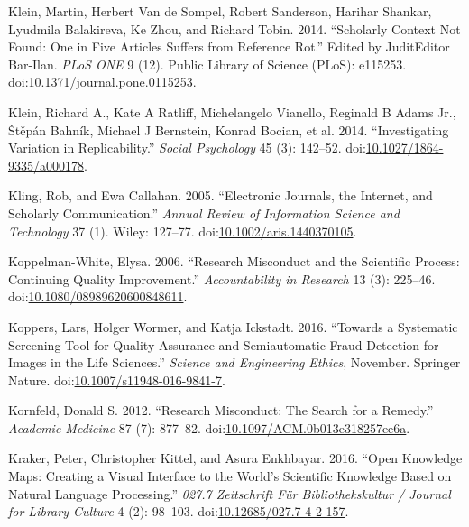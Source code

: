 \documentclass[a5paper]{book}
\begin{document}
\hypertarget{ref-doi:10.1371ux2fjournal.pone.0115253}{}
Klein, Martin, Herbert Van de Sompel, Robert Sanderson, Harihar Shankar,
Lyudmila Balakireva, Ke Zhou, and Richard Tobin. 2014. ``Scholarly
Context Not Found: One in Five Articles Suffers from Reference Rot.''
Edited by JuditEditor Bar-Ilan. \emph{PLoS ONE} 9 (12). Public Library
of Science (PLoS): e115253.
doi:\href{https://doi.org/10.1371/journal.pone.0115253}{10.1371/journal.pone.0115253}.

\hypertarget{ref-doi:10.1027ux2f1864-9335ux2fa000178}{}
Klein, Richard A., Kate A Ratliff, Michelangelo Vianello, Reginald B
Adams Jr., Štěpán Bahník, Michael J Bernstein, Konrad Bocian, et al.
2014. ``Investigating Variation in Replicability.'' \emph{Social
Psychology} 45 (3): 142--52.
doi:\href{https://doi.org/10.1027/1864-9335/a000178}{10.1027/1864-9335/a000178}.

\hypertarget{ref-doi:10.1002ux2faris.1440370105}{}
Kling, Rob, and Ewa Callahan. 2005. ``Electronic Journals, the Internet,
and Scholarly Communication.'' \emph{Annual Review of Information
Science and Technology} 37 (1). Wiley: 127--77.
doi:\href{https://doi.org/10.1002/aris.1440370105}{10.1002/aris.1440370105}.

\hypertarget{ref-doi:10.1080ux2f08989620600848611}{}
Koppelman-White, Elysa. 2006. ``Research Misconduct and the Scientific
Process: Continuing Quality Improvement.'' \emph{Accountability in
Research} 13 (3): 225--46.
doi:\href{https://doi.org/10.1080/08989620600848611}{10.1080/08989620600848611}.

\hypertarget{ref-doi:10.1007ux2fs11948-016-9841-7}{}
Koppers, Lars, Holger Wormer, and Katja Ickstadt. 2016. ``Towards a
Systematic Screening Tool for Quality Assurance and Semiautomatic Fraud
Detection for Images in the Life Sciences.'' \emph{Science and
Engineering Ethics}, November. Springer Nature.
doi:\href{https://doi.org/10.1007/s11948-016-9841-7}{10.1007/s11948-016-9841-7}.

\hypertarget{ref-doi:10.1097ux2fACM.0b013e318257ee6a}{}
Kornfeld, Donald S. 2012. ``Research Misconduct: The Search for a
Remedy.'' \emph{Academic Medicine} 87 (7): 877--82.
doi:\href{https://doi.org/10.1097/ACM.0b013e318257ee6a}{10.1097/ACM.0b013e318257ee6a}.

\hypertarget{ref-doi:10.12685ux2f027.7-4-2-157}{}
Kraker, Peter, Christopher Kittel, and Asura Enkhbayar. 2016. ``Open
Knowledge Maps: Creating a Visual Interface to the World's Scientific
Knowledge Based on Natural Language Processing.'' \emph{027.7
Zeitschrift Für Bibliothekskultur / Journal for Library Culture} 4 (2):
98--103.
doi:\href{https://doi.org/10.12685/027.7-4-2-157}{10.12685/027.7-4-2-157}.
\end{document}
